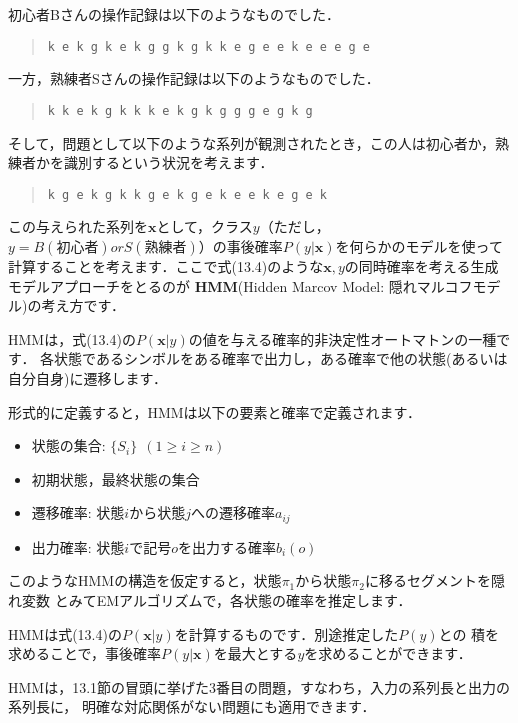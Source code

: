 初心者Bさんの操作記録は以下のようなものでした．

\begin{quote}
\tt k e k g k e k g g k g k k e g e e k e e e g e
\end{quote}

一方，熟練者Sさんの操作記録は以下のようなものでした．

\begin{quote}
\tt k k e k g k k k e k g k g g g e g k g
\end{quote}

そして，問題として以下のような系列が観測されたとき，この人は初心者か，熟練者かを識別するという状況を考えます．

\begin{quote}
\tt k g e k g k k g e k g e k e e k e g e k
\end{quote}


この与えられた系列を$\bm{x}$として，クラス$y$（ただし，$y= B (初心者) or S (熟練者)$）の事後確率$P(y|\bm{x})$を何らかのモデルを使って計算することを考えます．ここで式(13.4)のような$\bm{x}, y$の同時確率を考える生成モデルアプローチをとるのが
\textbf{HMM}(Hidden Marcov Model: 隠れマルコフモデル)の考え方です．

HMMは，式(13.4)の$P(\bm{x}|y)$の値を与える確率的非決定性オートマトンの一種です．
各状態であるシンボルをある確率で出力し，ある確率で他の状態(あるいは自分自身)に遷移します．


形式的に定義すると，HMMは以下の要素と確率で定義されます．

\begin{itemize}
\item 状態の集合: $\{S_i\}~~(1 \ge i \ge n)$
\item 初期状態，最終状態の集合
\item 遷移確率: 状態$i$から状態$j$への遷移確率$a_{ij}$
\item 出力確率: 状態$i$で記号$o$を出力する確率$b_i(o)$
\end{itemize}

このようなHMMの構造を仮定すると，状態$\pi_1$から状態$\pi_2$に移るセグメントを隠れ変数
とみてEMアルゴリズムで，各状態の確率を推定します．

HMMは式(13.4)の$P(\bm{x}|y)$を計算するものです．別途推定した$P(y)$との
積を求めることで，事後確率$P(y|\bm{x})$を最大とする$y$を求めることができます．

HMMは，13.1節の冒頭に挙げた3番目の問題，すなわち，入力の系列長と出力の系列長に，
明確な対応関係がない問題にも適用できます．

